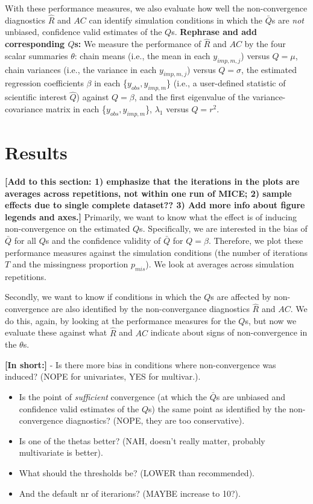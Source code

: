 \documentclass[Royal,times,sageh]{sagej}
\begin{document}
With these performance measures, we also evaluate how well the
non-convergence diagnostics \(\widehat{R}\) and \(AC\) can identify
simulation conditions in which the \(\bar{Q}\)s are \emph{not} unbiased,
confidence valid estimates of the \(Q\)s. \textbf{Rephrase and add
corresponding \(Q\)s:} We measure the performance of \(\widehat{R}\) and
\(AC\) by the four scalar summaries \(\theta\): chain means (i.e., the
mean in each \(y_{imp, m, j}\)) versus \(Q=\mu\), chain variances (i.e.,
the variance in each \(y_{imp, m, j}\)) versus \(Q=\sigma\), the
estimated regression coefficients \(\beta\) in each
\{\(y_{obs}, y_{imp, m}\)\} (i.e., a user-defined statistic of
scientific interest \(\hat{Q}\)) against \(Q=\beta\), and the first
eigenvalue of the variance-covariance matrix in each
\{\(y_{obs}, y_{imp, m}\)\}, \(\lambda_1\) versus \(Q=r^2\).

\hypertarget{results}{%
\section{Results}\label{results}}

\textbf{{[}Add to this section: 1) emphasize that the iterations in the
plots are averages across repetitions, not within one run of MICE; 2)
sample effects due to single complete dataset?? 3) Add more info about
figure legends and axes.{]}} Primarily, we want to know what the effect
is of inducing non-convergence on the estimated \(Q\)s. Specifically, we
are interested in the bias of \(\bar{Q}\) for all \(Q\)s and the
confidence validity of \(\bar{Q}\) for \(Q=\beta\). Therefore, we plot
these performance measures against the simulation conditions (the number
of iterations \(T\) and the missingness proportion \(p_{mis}\)). We look
at averages across simulation repetitions.

Secondly, we want to know if conditions in which the \(Q\)s are affected
by non-convergence are also identified by the non-convergance
diagnostics \(\widehat{R}\) and \(AC\). We do this, again, by looking at
the performance measures for the \(Q\)s, but now we evaluate these
against what \(\widehat{R}\) and \(AC\) indicate about signs of
non-convergence in the \(\theta\)s.

\textbf{{[}In short:{]}} - Is there more bias in conditions where
non-convergence was induced? (NOPE for univariates, YES for multivar.).

\begin{itemize}
\item
  Is the point of \emph{sufficient} convergence (at which the
  \(\bar{Q}\)s are unbiased and confidence valid estimates of the
  \(Q\)s) the same point as identified by the non-convergence
  diagnostics? (NOPE, they are too conservative).
\item
  Is one of the thetas better? (NAH, doesn't really matter, probably
  multivariate is better).
\item
  What should the thresholds be? (LOWER than recommended).
\item
  And the default nr of iterarions? (MAYBE increase to 10?).
\end{itemize}
\end{document}

